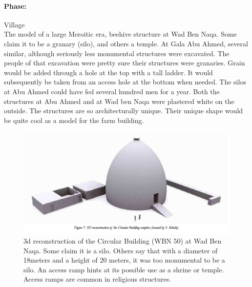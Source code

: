 \documentclass[a4paper,12pt]{scrreprt}
\begin{document}
\paragraph{Phase:} Village\\

The model of a large Meroitic era, beehive structure at Wad Ben Naqa. Some claim it to be a granary (silo), and others a temple. At Gala Abu Ahmed, several similar, although seriously less monumental structures were excavated. The people of that excavation were pretty sure their structures were granaries. Grain would be added through a hole at the top with a tall ladder. It would subsequently be taken from an access hole at the bottom when needed. The silos at Abu Ahmed could have fed several hundred men for a year. Both the structures at Abu Ahmed and at Wad ben Naqa were plastered white on the outside. The structures are so architecturally unique. Their unique shape would be quite cool as a model for the farm building.

\begin{figure}[H]
	\centering
	\includegraphics[width=\textwidth]{img/farmstead/3d_reconstruction}
	\caption{3d reconstruction of the Circular Building (WBN 50) at Wad Ben Naqa. Some claim it is a silo. Others say that with a diameter of 18meters and a height of 20 meters, it was too monumental to be a silo. An access ramp hints at its possible use as a shrine or temple. Access ramps are common in religious structures. }
\end{figure}
\end{document}

